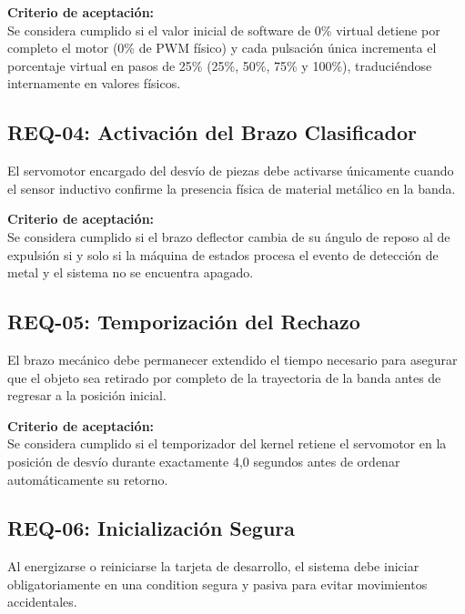 \documentclass[12pt, letterpaper]{article}
\begin{document}
\vspace{0.5cm}

\noindent \textbf{Criterio de aceptación:} \\
Se considera cumplido si el valor inicial de software de 0\% virtual detiene por completo el motor (0\% de PWM físico) y cada pulsación única incrementa el porcentaje virtual en pasos de 25\% (25\%, 50\%, 75\% y 100\%), traduciéndose internamente en valores físicos.

\subsection{REQ-04: Activación del Brazo Clasificador}
El servomotor encargado del desvío de piezas debe activarse únicamente cuando el sensor inductivo confirme la presencia física de material metálico en la banda.

\vspace{0.5cm}

\noindent \textbf{Criterio de aceptación:} \\
Se considera cumplido si el brazo deflector cambia de su ángulo de reposo al de expulsión si y solo si la máquina de estados procesa el evento de detección de metal y el sistema no se encuentra apagado.

\subsection{REQ-05: Temporización del Rechazo}
El brazo mecánico debe permanecer extendido el tiempo necesario para asegurar que el objeto sea retirado por completo de la trayectoria de la banda antes de regresar a la posición inicial.

\vspace{0.5cm}

\noindent \textbf{Criterio de aceptación:} \\
Se considera cumplido si el temporizador del kernel retiene el servomotor en la posición de desvío durante exactamente 4,0 segundos antes de ordenar automáticamente su retorno.

\subsection{REQ-06: Inicialización Segura}
Al energizarse o reiniciarse la tarjeta de desarrollo, el sistema debe iniciar obligatoriamente en una condition segura y pasiva para evitar movimientos accidentales.

\vspace{0.5cm}
\end{document}
